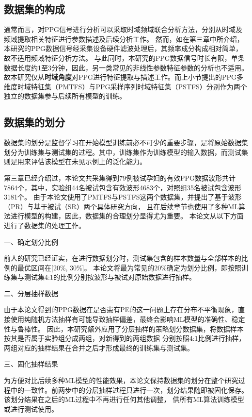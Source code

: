 \subsection{数据集的构成}
通常而言，对PPG信号进行分析可以采取时域频域联合分析方法，分别从时域及频域提取相关特征进行参数描述及后续分析工作。
然而，如在第三章中所介绍，本研究的PPG数据信号经采集设备硬件滤波处理后，其频率成分构成相对简单，故不适用频域特征分析方法。
与此同时，本研究的PPG数据信号时长有限，单条数据长度约1至3分钟，因此，另一类常见的非线性参数特征参数的分析也不适用。
故本研究仅从\textbf{时域角度}对PPG进行特征提取与描述工作。而上小节提出的PPG多维度时域特征集（PMTFS）与PPG采样序列时域特征集（PSTFS）分别作为两个独立的数据集参与后续所有模型的训练。

\subsection{数据集的划分}
数据集的划分是监督学习在开始模型训练前必不可少的重要步骤，是将原始数据集划分为训练集与测试集的过程。其中，训练集作为训练模型的输入数据，而测试集则是用来评估该模型在未见示例上的泛化能力。

第三章已经介绍过，本论文共采集得到79例被试孕妇的有效PPG数据波形共计7864个，其中，实验组44名被试包含有效波形4683个，对照组35名被试包含波形3181个。
由于本论文使用了PMTFS与PSTFS这两个数据集，并提出了基于波形（PR）与基于被试（SR）两个具体研究方向，
且在后续章节也使用了多种ML算法进行模型的构建，因此，数据集的合理划分显得尤为重要。
本论文从以下方面进行了数据集的处理工作。

一、确定划分比例

前人的研究已经证实，在进行数据划分时，测试集包含的样本数量与全部样本的比例的最优区间在[20\%, 30\%]\cite{Gholamy2018Why7O}。
本论文将最为常见的20\%确定为划分比例，即按照训练集与测试集4:1的比例分别按波形与被试对原始数据进行抽样。

二、分层抽样数据

由于本论文得到的PPG数据在是否患有PE的这一问题上存在分布不平衡现象，直接使用纯随机方法抽样有可能导致抽样偏差，最终会影响ML模型的准确性、稳定性与鲁棒性\cite{Aurélien2018}。
因此，本研究额外应用了分层抽样的策略划分数据集，将数据样本按其是否属于实验组分成两组，对新得到的两组数据
分别按照4:1比例进行抽样，两组对应的抽样结果在合并之后才形成最终的训练集与测试集\cite{Aurélien2018}。

三、固化抽样结果

为方便对比后续多种ML模型的性能效果，本论文保持数据集的划分在整个研究过程中的一致性。前两步中的分层抽样过程只进行一次，划分结果随即被固化保存。该划分结果在之后的ML过程中不再进行任何其他调整，
供所有ML算法训练模型或进行测试使用。

